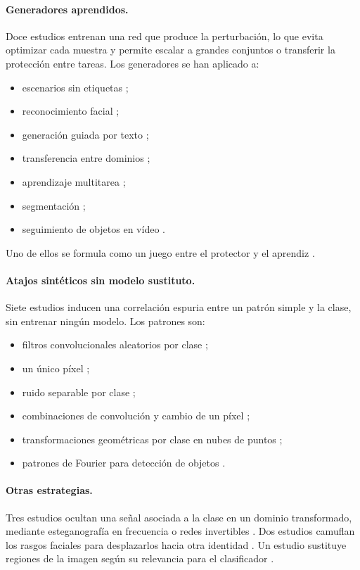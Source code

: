 \paragraph{Generadores aprendidos.} Doce estudios entrenan una red que produce la perturbación, lo que evita optimizar cada muestra y permite escalar a grandes conjuntos o transferir la protección entre tareas. Los generadores se han aplicado a:
\begin{itemize}
\item escenarios sin etiquetas \cite{S0003,S0154};
\item reconocimiento facial \cite{S0020,S0038};
\item generación guiada por texto \cite{S0039,S0062};
\item transferencia entre dominios \cite{S0056};
\item aprendizaje multitarea \cite{S0072};
\item segmentación \cite{S0074,S0202};
\item seguimiento de objetos en vídeo \cite{S0151}.
\end{itemize}
Uno de ellos se formula como un juego entre el protector y el aprendiz \cite{S0088}.

\paragraph{Atajos sintéticos sin modelo sustituto.} Siete estudios inducen una correlación espuria entre un patrón simple y la clase, sin entrenar ningún modelo. Los patrones son:
\begin{itemize}
\item filtros convolucionales aleatorios por clase \cite{S0063};
\item un único píxel \cite{S0068};
\item ruido separable por clase \cite{S0137};
\item combinaciones de convolución y cambio de un píxel \cite{S0126,S0144};
\item transformaciones geométricas por clase en nubes de puntos \cite{S0148};
\item patrones de Fourier para detección de objetos \cite{S0127}.
\end{itemize}

\paragraph{Otras estrategias.} Tres estudios ocultan una señal asociada a la clase en un dominio transformado, mediante esteganografía en frecuencia \cite{S0032,S0041} o redes invertibles \cite{S0047}. Dos estudios camuflan los rasgos faciales para desplazarlos hacia otra identidad \cite{S0060,S0135}. Un estudio sustituye regiones de la imagen según su relevancia para el clasificador \cite{S0647}.


